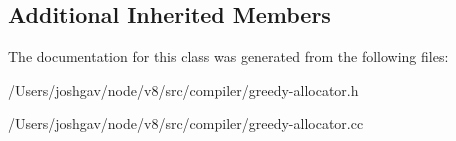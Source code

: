 \subsection*{Additional Inherited Members}


The documentation for this class was generated from the following files\+:\begin{DoxyCompactItemize}
\item 
/\+Users/joshgav/node/v8/src/compiler/greedy-\/allocator.\+h\item 
/\+Users/joshgav/node/v8/src/compiler/greedy-\/allocator.\+cc\end{DoxyCompactItemize}
